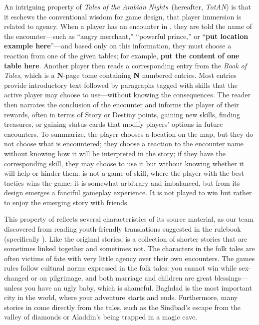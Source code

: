 \documentclass[a4paper]{article}
\begin{document}
An intriguing property of \textit{Tales of the Arabian Nights}~(hereafter, \textit{TotAN}) is that it eschews the conventional wisdom for game design,
that player immersion is related to agency.
When a player has an encounter in \totan, they are told the name of the
encounter---such as ``angry merchant,''  ``powerful prince,'' or
``\textbf{put location example here}''---and based only on this information,
they must choose a reaction from one of the given tables; for example, \textbf{put the content of one table here}.
Another player then reads a corresponding entry from 
the \textit{Book of Tales}, which is a \textbf{N}-page
tome containing \textbf{N} numbered entries.
Most entries provide introductory text followed by paragraphs
tagged with skills that the active player may choose to use---without
knowing the consequences. The reader then narrates the conclusion of the
encounter and informs the player of their rewards, often in terms of
Story or Destiny points, gaining new skills, finding treasures, or
gaining status cards that modify players' options in future encounters.
To summarize, the player chooses a location on the map, but they do not 
choose what is encountered; they choose a reaction to the encounter name
without knowing how it will be interpreted in the story;
if they have the corresponding skill, they may choose to use it but
without knowing whether it will help or hinder them.
\totan{} is not a game of skill, where the player with the best tactics
wins the game: it is somewhat arbitrary and imbalanced, but from its
design emerges a fanciful gameplay experience. It is not played to win
but rather to enjoy the emerging story with friends.

This property of \totan{} reflects several characteristics
of its source material,
as our team discovered from reading youth-friendly translations suggested in the
rulebook (specifically \citet{Neil1994}).
Like the original stories, \totan{} is a collection of shorter stories
that are sometimes linked together and sometimes not.
The characters in the folk tales are often victims of fate with
very little agency over their own encounters. The games rules follow
cultural norms expressed in the folk tales:
you cannot win while sex-changed or on pilgrimage, and both marriage
and children are great blessings---unless you have an ugly baby,
which is shameful.
Baghdad is the most important city in the world, where your adventure starts
and ends.
Furthermore, many stories in \totan{} come directly from the tales,
such as the Sindbad's escape from the valley of diamonds or Aladdin's
being trapped in a magic cave. 
\end{document}
